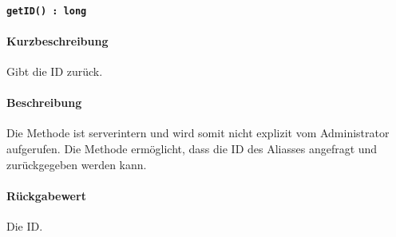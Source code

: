 \paragraph{\texttt{getID() : long}}%
\paragraph*{Kurzbeschreibung}
Gibt die ID zurück.
\paragraph*{Beschreibung}
Die Methode ist serverintern und wird somit nicht explizit vom Administrator aufgerufen.
Die Methode ermöglicht, dass die ID des Aliasses angefragt und zurückgegeben werden kann.
\paragraph*{Rückgabewert}
Die ID.
